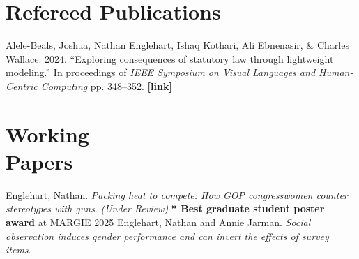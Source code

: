 \documentclass[margin,line,pifont,palatino,courier]{res}
\newenvironment{list1}{
  \begin{list}{\ding{113}}{%
      \setlength{\itemsep}{0in}
      \setlength{\parsep}{0in} \setlength{\parskip}{0in}
      \setlength{\topsep}{0in} \setlength{\partopsep}{0in}
      \setlength{\leftmargin}{0.17in}}}{\end{list}}
\begin{document}
\begin{resume}
\section{\sc Refereed Publications}
Alele-Beals, Joshua, Nathan Englehart, Ishaq Kothari, Ali Ebnenasir, \& Charles Wallace. 2024. ``Exploring consequences of statutory law through lightweight modeling.'' In proceedings of \textit{IEEE Symposium on Visual Languages and Human-Centric Computing} pp. 348--352. \textbf{[\href{https://ieeexplore.ieee.org/abstract/document/10714533}{link}]} %

\section{\sc Working \\ Papers}
Englehart, Nathan. \textit{Packing heat to compete: How GOP congresswomen counter stereotypes with guns}. \textit{(Under Review)} 
\vskip 0.0001in
\quad \textbf{* Best graduate student poster award} at MARGIE 2025 %
\vskip 0.0001in
Englehart, Nathan and Annie Jarman. \textit{Social observation induces gender performance and can invert the effects of survey items}. 


\end{resume}
\end{document}
